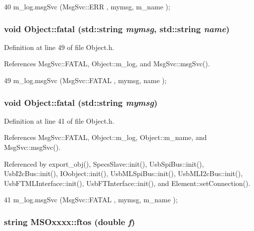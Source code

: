 \begin{DoxyCode}
40 { m_log.msgSvc (MsgSvc::ERR     , mymsg, m_name ); }
\end{DoxyCode}
\hypertarget{classObject_ae62acd3d09f716220f75f252dc38bc9a}{
\subsubsection[{fatal}]{\setlength{\rightskip}{0pt plus 5cm}void Object::fatal (std::string {\em mymsg}, \/  std::string {\em name})}}
\label{classObject_ae62acd3d09f716220f75f252dc38bc9a}


Definition at line 49 of file Object.h.

References MsgSvc::FATAL, Object::m\_\-log, and MsgSvc::msgSvc().


\begin{DoxyCode}
49 { m_log.msgSvc (MsgSvc::FATAL   , mymsg, name ); }
\end{DoxyCode}
\hypertarget{classObject_aad5a16aac7516ce65bd5ec02ab07fc80}{
\subsubsection[{fatal}]{\setlength{\rightskip}{0pt plus 5cm}void Object::fatal (std::string {\em mymsg})}}
\label{classObject_aad5a16aac7516ce65bd5ec02ab07fc80}


Definition at line 41 of file Object.h.

References MsgSvc::FATAL, Object::m\_\-log, Object::m\_\-name, and MsgSvc::msgSvc().

Referenced by export\_\-obj(), SpecsSlave::init(), UsbSpiBus::init(), UsbI2cBus::init(), IOobject::init(), UsbMLSpiBus::init(), UsbMLI2cBus::init(), UsbFTMLInterface::init(), UsbFTInterface::init(), and Element::setConnection().


\begin{DoxyCode}
41 { m_log.msgSvc (MsgSvc::FATAL   , mymsg, m_name ); }
\end{DoxyCode}
\hypertarget{classMSOxxxx_ab9c897c3dc0a52cbe5a5da67fc520ed7}{
\subsubsection[{ftos}]{\setlength{\rightskip}{0pt plus 5cm}string MSOxxxx::ftos (double {\em f})}}
\label{classMSOxxxx_ab9c897c3dc0a52cbe5a5da67fc520ed7}


